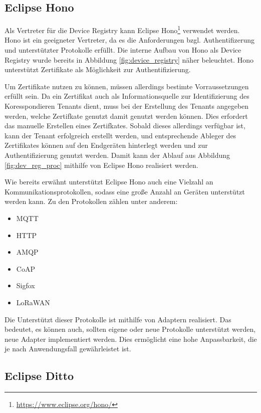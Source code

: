 \subsection{Eclipse Hono}

Als Vertreter für die Device Registry kann Eclipse Hono\footnote{\url{https://www.eclipse.org/hono/}} verwendet werden. Hono ist ein geeigneter Vertreter, da es die Anforderungen bzgl. Authentifizerung und unterstützter Protokolle erfüllt. Die interne Aufbau von Hono als Device Registry wurde bereits in Abbildung \vref{fig:device_registry} näher beleuchtet. Hono unterstützt Zertifikate als Möglichkeit zur Authentifizierung.

Um Zertifikate nutzen zu können, müssen allerdings bestimte Vorraussetzungen erfüllt sein. Da ein Zertifikat auch als Informationsquelle zur Identifizierung des Koresspondieren Tenants dient, muss bei der Erstellung des Tenants angegeben werden, welche Zertifkate genutzt damit genutzt werden können. Dies erfordert das manuelle Erstellen eines Zertifkates. Sobald dieses allerdings verfügbar ist, kann der Tenant erfolgreich erstellt werden, und entsprechende Ableger des Zertifikates können auf den Endgeräten hinterlegt werden und zur Authentifizierung genutzt werden. Damit kann der Ablauf aus Abbildung \vref{fig:dev_reg_proc} mithilfe von Eclipse Hono realisiert werden.

Wie bereits erwähnt unterstützt Eclipse Hono auch eine Vielzahl an Kommunikationsprotokollen, sodass eine große Anzahl an Geräten unterstützt werden kann. Zu den Protokollen zählen unter anderem:

\begin{itemize}
    \item MQTT
    \item HTTP
    \item AMQP
    \item CoAP
    \item Sigfox
    \item LoRaWAN
\end{itemize}

Die Unterstützt dieser Protokolle ist mithilfe von Adaptern realisiert. Das bedeutet, es können auch, sollten eigene oder neue Protokolle unterstützt werden, neue Adapter implementiert werden. Dies ermöglicht eine hohe Anpassbarkeit, die je nach Anwendungsfall gewährleistet ist.

\subsection{Eclipse Ditto}


